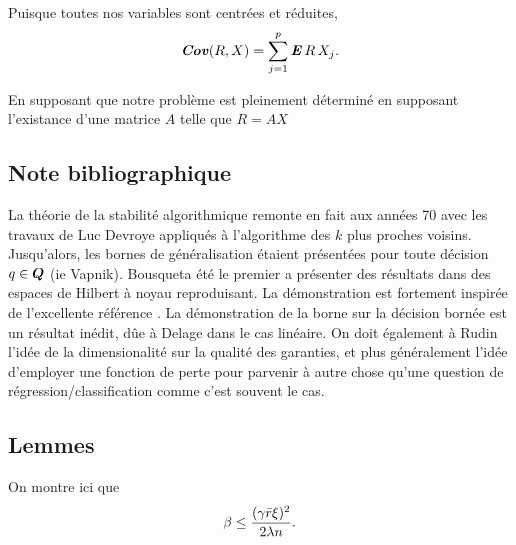 Puisque toutes nos variables sont centrées et réduites,
\begin{equation}
  \operatorname{\mbox{\textbf{\textit{Cov}}}}(R,X) = \sum_{j=1}^p\operatorname{\mbox{\textbf{\textit{E}}}} R\,X_j.
\end{equation}

En supposant que notre problème est pleinement déterminé en supposant l'existance d'une
matrice $A$ telle que $R = AX$


\subsection{Note bibliographique}

La théorie de la stabilité algorithmique remonte en fait aux années 70 avec les travaux de
Luc Devroye appliqués à l'algorithme des $k$ plus proches voisins\cit. Jusqu'alors, les
bornes de généralisation étaient présentées pour toute décision $q \in \bm Q$ (ie
Vapnik). Bousquet\cit a été le premier a présenter des résultats dans des espaces de
Hilbert à noyau reproduisant. La démonstration est fortement inspirée de l'excellente
référence \cite{mohri2012foundations}. La démonstration de la borne sur la décision bornée
est un résultat inédit, dûe à Delage dans le cas linéaire. On doit également à Rudin
l'idée de la dimensionalité sur la qualité des garanties, et plus généralement l'idée
d'employer une fonction de perte pour parvenir à autre chose qu'une question de
régression/classification comme c'est souvent le cas.



\subsection{Lemmes}


\begin{lemme}[Stabilité]
\label{lem:stab}
On montre ici que
\begin{equation}
  \beta \leq \frac{(\gamma\bar r\xi)^2}{2\lambda n}.
\end{equation}
\end{lemme}


